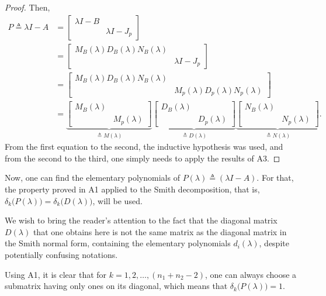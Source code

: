 \documentclass[11pt]{article}
\begin{document}
\begin{proof}
Then, 
\begin{align*}
P \triangleq \lambda I - A &= \begin{bmatrix}
\lambda I - B & \\
& \lambda I - J_p 
\end{bmatrix}\\
&= \begin{bmatrix}
M_{B}(\lambda) D_{B}(\lambda) N_{B}(\lambda) & \\
& \lambda I - J_p
\end{bmatrix}\\
&= \begin{bmatrix}
M_{B}(\lambda) D_{B}(\lambda) N_{B}(\lambda) & \\
& M_{p}(\lambda) D_{p}(\lambda) N_{p}(\lambda)
\end{bmatrix}\\
&= \underbrace{\begin{bmatrix}
M_{B}(\lambda) & \\
& M_{p}(\lambda)
\end{bmatrix}}_{\triangleq M(\lambda)}\underbrace{\begin{bmatrix}
D_{B}(\lambda) & \\
& D_{p}(\lambda)
\end{bmatrix}}_{\triangleq D(\lambda)}\underbrace{\begin{bmatrix}
N_{B}(\lambda) & \\
& N_{p}(\lambda)
\end{bmatrix}}_{\triangleq N(\lambda)}.
\end{align*}
From the first equation to the second, the inductive hypothesis was used, and from the second to the third, one simply needs to apply the results of A3.
\end{proof}

Now, one can find the elementary polynomials of $P(\lambda) \triangleq (\lambda I - A)$. For that, the property proved in A1 applied to the Smith decomposition, that is, $\delta_k\big(P(\lambda)\big) = \delta_k\big(D(\lambda)\big)$, will be used.

We wish to bring the reader's attention to the fact that the diagonal matrix $D(\lambda)$ that one obtains here is not the same matrix as the diagonal matrix in the Smith normal form, containing the elementary polynomials $d_i(\lambda)$, despite potentially confusing notations.

Using A1, it is clear that for $k = 1, 2, \dots, (n_1 + n_2 - 2)$, one can always choose a submatrix having only ones on its diagonal, which means that $\delta_k\big(P(\lambda)\big) = 1$. 
\end{document}
